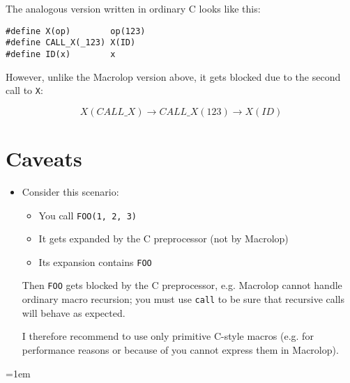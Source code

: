 \documentclass[12pt]{article}
\theoremstyle{break}
\begin{document}
The analogous version written in ordinary C looks like this:

\begin{verbatim}
#define X(op)        op(123)
#define CALL_X(_123) X(ID)
#define ID(x)        x
\end{verbatim}

However, unlike the Macrolop version above, it gets blocked due to the
second call to \texttt{X}:

$$
X(CALL\_X) \to CALL\_X(123) \to X(ID)
$$

\section{Caveats}

\begin{itemize}
\item Consider this scenario:
    \begin{itemize}
        \item You call \texttt{FOO(1, 2, 3)}
        \item It gets expanded by the C preprocessor (not by Macrolop)
        \item Its expansion contains \texttt{FOO}
    \end{itemize}
Then \texttt{FOO} gets blocked by the C preprocessor, e.g. Macrolop cannot handle ordinary
macro recursion; you must use \texttt{call} to be sure that recursive calls
will behave as expected.

I therefore recommend to use only primitive C-style macros (e.g. for performance
reasons or because of you cannot express them in Macrolop).
\end{itemize}

\emergencystretch=1em
\printbibliography
\end{document}
